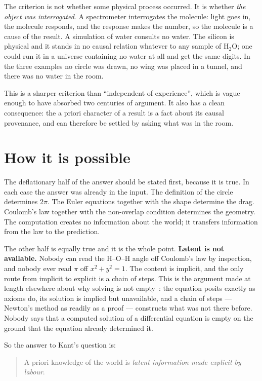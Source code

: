 \documentclass[11pt]{article}
\begin{document}
The criterion is not whether some physical process occurred. It is whether \emph{the object was
interrogated}. A spectrometer interrogates the molecule: light goes in, the molecule responds, and
the response makes the number, so the molecule is a cause of the result. A simulation of water
consults no water. The silicon is physical and it stands in no causal relation whatever to any
sample of H$_2$O; one could run it in a universe containing no water at all and get the same
digits. In the three examples no circle was drawn, no wing was placed in a tunnel, and there was no
water in the room.

This is a sharper criterion than ``independent of experience'', which is vague enough to have
absorbed two centuries of argument. It also has a clean consequence: the a priori character of a
result is a fact about its causal provenance, and can therefore be settled by asking what was in the
room.

\section{How it is possible}\label{sec:how}

The deflationary half of the answer should be stated first, because it is true. In each case the
answer was already in the input. The definition of the circle determines $2\pi$. The Euler equations
together with the shape determine the drag. Coulomb's law together with the non-overlap condition
determines the geometry. The computation creates no information about the world; it transfers
information from the law to the prediction.

The other half is equally true and it is the whole point. \textbf{Latent is not available.} Nobody
can read the H--O--H angle off Coulomb's law by inspection, and nobody ever read $\pi$ off
$x^2+y^2=1$. The content is implicit, and the only route from implicit to explicit is a chain of
steps. This is the argument made at length elsewhere about why solving is not
empty~\cite{education,ainumerical}: the equation posits exactly as axioms do, its solution is implied but unavailable, and a chain of steps ---
Newton's method as readily as a proof --- constructs what was not there before. Nobody says that a
computed solution of a differential equation is empty on the ground that the equation already
determined it.

So the answer to Kant's question is:

\begin{quote}
A priori knowledge of the world is \emph{latent information made explicit by labour}.
\end{quote}
\end{document}
